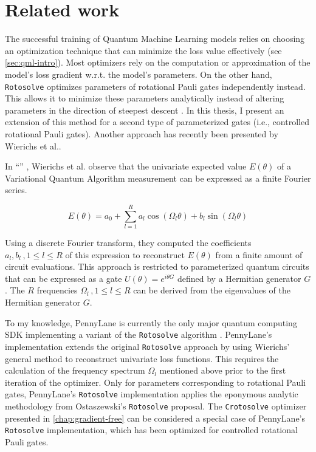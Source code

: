 \chapter{Related work}
\label{chap:related-work}

The successful training of Quantum Machine Learning models relies on choosing an
optimization technique that can minimize the loss value effectively (see
\autoref{sec:qml-intro}).
Most optimizers rely on the computation or approximation of the model's loss
gradient w.r.t. the model's parameters.
On the other hand, \texttt{Rotosolve} optimizes parameters of rotational Pauli
gates independently instead.
This allows it to minimize these parameters analytically instead of altering
parameters in the direction of steepest descent
\cite{ostaszewski_structure_2021}.
In this thesis, I present an extension of this method for a second type of
parameterized gates (i.e., controlled rotational Pauli gates).
Another approach has recently been presented by Wierichs et al..

In ``\emph{}''
\cite{wierichs_general_2022}, Wierichs et al. observe that the univariate
expected value $E(\theta)$ of a Variational Quantum Algorithm measurement can be
expressed as a finite Fourier series.

$$E(\theta) = a_0 + \sum_{l=1}^R a_l \cos(\Omega_l \theta) + b_l \sin(\Omega_l \theta)$$

Using a discrete Fourier transform, they computed the coefficients
$a_l, b_l\,, 1 \leq l \leq R$ of this expression to reconstruct $E(\theta)$ from a
finite amount of circuit evaluations.
This approach is restricted to parameterized quantum circuits that can be
expressed as a gate $U(\theta) = e^{i \theta G}$ defined by a Hermitian
generator $G$.
The $R$ frequencies $\Omega_l\,, 1 \leq l \leq R$ can be derived from the
eigenvalues of the Hermitian generator $G$.

To my knowledge, PennyLane is currently the only major quantum computing SDK
implementing a variant of the \texttt{Rotosolve} algorithm
\cite{bergholm_pennylane_2018,ostaszewski_structure_2021}.
PennyLane's implementation extends the original \texttt{Rotosolve} approach by
using Wierichs' general method to reconstruct univariate loss functions.
This requires the calculation of the frequency spectrum $\Omega_l$ mentioned
above prior to the first iteration of the optimizer.
Only for parameters corresponding to rotational Pauli gates, PennyLane's
\texttt{Rotosolve} implementation applies the eponymous analytic methodology
from Ostaszewski's \texttt{Rotosolve} proposal.
The \texttt{Crotosolve} optimizer presented in \autoref{chap:gradient-free} can
be considered a special case of PennyLane's \texttt{Rotosolve} implementation,
which has been optimized for controlled rotational Pauli gates.
